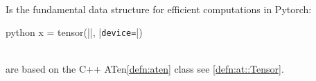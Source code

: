 \begin{defnbox}\nospacing
    \begin{defn}[Tensor]\label{defn:tensor}\leavevmode\\
        Is the fundamental data structure for efficient computations in Pytorch:
        \begin{mintlinebox}{python}
            x = tensor(|\texttt{}|, |\texttt{\optc{[}device=\optc{device]}}|)
        \end{mintlinebox}
    \end{defn}
\end{defnbox}
\begin{corbox}\nospacing
    \begin{cor}\label{cor:torch_tensor_implementation_details}\leavevmode\\
         are based on the C++ ATen\cref{defn:aten} class  see \cref{defn:at::Tensor}.
    \end{cor}
\end{corbox}
